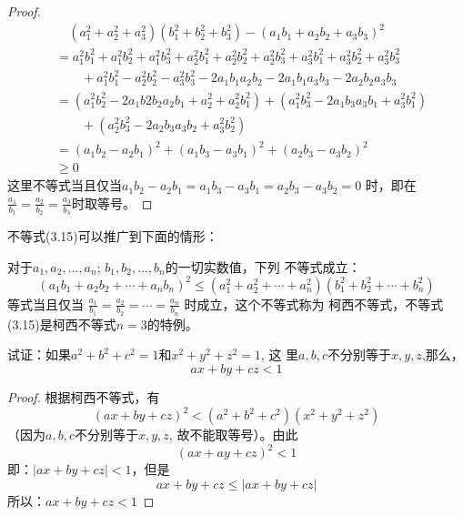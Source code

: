 \begin{proof}
    \[\begin{split}
&\quad   (a_1^2+a_2^2+a_3^2)(b_1^2+b_2^2+b_3^2)-(a_1b_1+a_2b_2+a_3b_3)^2\\
 & = a_1^2b_1^2+a_1^2b_2^2+a_1^2b_3^2
    +a_2^2b_1^2+a_2^2b_2^2+a_2^2b_3^2
    +a_3^2b_1^2+a_3^2b_2^2+a_3^2b_3^2\\
  &\qquad  + a_1^2b_1^2-a_2^2b^2_2-a_3^2b_3^2
    -2a_1b_1a_2b_2-2a_1b_1a_3b_3-2a_2b_2a_3b_3\\
    & = (a_1^2b_2^2-2a_1b2b_2a_2b_1+a_2^2+a_2^2b_1^2)
    +(a_1^2b_3^2-2a_1b_3a_3b_1+a_3^2b_1^2)\\
    &\qquad     +(a_2^2b_3^2-2a_2b_3a_3b_2+a_3^2b_2^2)\\
    & = (a_1b_2 -a_2b_1)^2+(a_1b_3-a_3b_1)^2+(a_2b_3-a_3b_2)^2\\
    & \ge 0        
    \end{split}\]
    这里不等式当且仅当$a_1b_2 -a_2b_1=a_1b_3-a_3b_1=a_2b_3-a_3b_2=0$   
    时，即在$\frac{a_1}{b_1}=\frac{a_2}{b_2}=\frac{a_3}{b_3}$时取等号。 
\end{proof}

不等式(3.15)可以推广到下面的情形：

\begin{blk}{}
    对于$a_1,a_2,\ldots,a_n$; $b_1,b_2,\ldots,b_n$的一切实数值，下列
    不等式成立：
    \[(a_1b_1+a_2b_2+\cdots+a_nb_n)^2\le (a_1^2+a_2^2+\cdots+a_n^2)(b_1^2+b_2^2+\cdots+b_n^2)\]
    等式当且仅当
    $\frac{a_1}{b_1}=\frac{a_2}{b_2}=\cdots=\frac{a_n}{b_n}$
    时成立，这个不等式称为
    柯西不等式，不等式(3.15)是柯西不等式$n=3$的特例。
\end{blk}



\begin{example}
    试证：如果$a^2+b^2+c^2=1$和$x^2+y^2+z^2=1$, 这
里$a,b,c$不分别等于$x,y,z$,那么，
\[ax+by+cz<1\]
\end{example}

\begin{proof}
根据柯西不等式，有
\[(ax+by+cz)^2<(a^2+b^2+c^2)(x^2+y^2+z^2)\]
（因为$a,b,c$不分别等于$x,y,z$, 故不能取等号）。由此
\[(ax+ay+cz)^2<1\]
即：$|ax+by+cz|<1$，但是
\[ax+by+cz\le |ax+by+cz|\]
所以：$ax+by+cz<1$
\end{proof}

